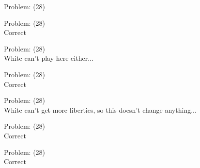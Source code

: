 \documentclass[11pt]{article}
\begin{document}
\begin{minipage}[t]{0.5\textwidth}
  {\centering
  
  Problem: (28)\\
  
  }
\end{minipage}
\begin{minipage}[t]{0.5\textwidth}
  {\centering
  
  Problem: (28)\\
  Correct\\
  }
\end{minipage}
\begin{minipage}[t]{0.5\textwidth}
  {\centering
  
  Problem: (28)\\
  White can't play here either...\\
  }
\end{minipage}
\begin{minipage}[t]{0.5\textwidth}
  {\centering
  
  Problem: (28)\\
  Correct\\
  }
\end{minipage}
\begin{minipage}[t]{0.5\textwidth}
  {\centering
  
  Problem: (28)\\
  White can't get more liberties, so this doesn't change anything...\\
  }
\end{minipage}
\begin{minipage}[t]{0.5\textwidth}
  {\centering
  
  Problem: (28)\\
  Correct\\
  }
\end{minipage}
\begin{minipage}[t]{0.5\textwidth}
  {\centering
  
  Problem: (28)\\
  Correct\\
  }
\end{minipage}
\end{document}
